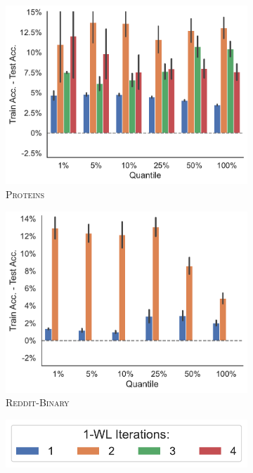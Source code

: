 \begin{figure}[!htb]
\begin{subfigure}[b]{0.3\textwidth}
		\includegraphics[width=\textwidth]{Figures/train_test_diff_k_wl_PROTEINS.pdf}
		\vspace*{-4ex} 
		\caption{\textsc{Proteins}}
	\end{subfigure}
	\hfill
	\begin{subfigure}[b]{0.3\textwidth}
		\centering
		\includegraphics[width=\textwidth]{Figures/train_test_diff_k_wl_REDDIT-BINARY.pdf}
		\vspace*{-4ex} 
		\caption{\textsc{Reddit-Binary}}
	\end{subfigure}
	\centering
	\begin{subfigure}[b]{0.3\textwidth}
		\centering
		\includegraphics[width=\textwidth]{Figures/train_test_diff_k_wl_legend.pdf}
		\vspace*{-4ex} 
	\end{subfigure}
\end{figure}

